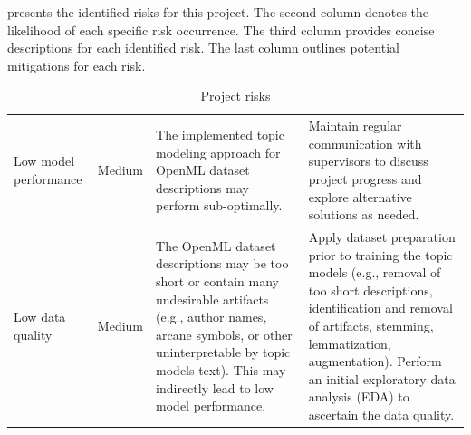 \documentclass{article}
\begin{document}
 presents the identified risks for this project. The second column denotes the likelihood of each specific risk occurrence. The third column provides concise descriptions for each identified risk. The last column outlines potential mitigations for each risk.

\begin{table}[h!]
    \centering
    \captionsetup{skip=5pt}
    \caption{Project risks}
    \label{table:project-risks}
    \renewcommand{\arraystretch}{1.5} %
    \begin{tabularx}{\textwidth} {
        | >{\raggedright\arraybackslash}m{} |
        >{\raggedright\arraybackslash}m{} |
        >{\raggedright\arraybackslash}m{} |
        >{\raggedright\arraybackslash}m{} |}
        \hline
        \rowcolor{lightblue}
        \multicolumn{1}{|c|}{\textbf{Risk label}} & \multicolumn{1}{c|}{\textbf{Likelihood}} & \multicolumn{1}{c|}{\textbf{Risk description}}                                                                                                                                                                                 & \multicolumn{1}{c|}{\textbf{Risk mitigation}}                                                                                                                                                                                                                                                                                                               \\
        \hline
        Low model performance                     & \cellcolor{lightyellow} Medium           & The implemented topic modeling approach for OpenML dataset descriptions may perform sub-optimally.                                                                                                                             & Maintain regular communication with supervisors to discuss project progress and explore alternative solutions as needed.                                                                                                                                                                                                                                    \\
        \hline
        Low data quality                          & \cellcolor{lightyellow} Medium           & The OpenML dataset descriptions may be too short or contain many undesirable artifacts (e.g., author names, arcane symbols, or other uninterpretable by topic models text). This may indirectly lead to low model performance. & Apply dataset preparation prior to training the topic models (e.g., removal of too short descriptions, identification and removal of artifacts, stemming, lemmatization, augmentation). Perform an initial exploratory data analysis (EDA) to ascertain the data quality.                                                                                                    \\

\end{tabularx}
\end{table}
\end{document}
